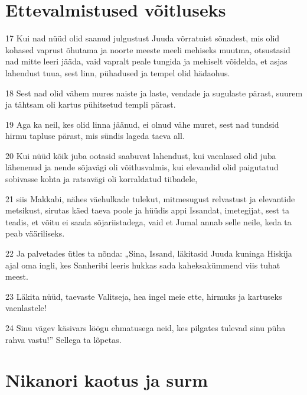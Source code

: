 \section*{Ettevalmistused võitluseks}

\par 17 Kui nad nüüd olid saanud julgustust Juuda võrratuist sõnadest, mis olid kohased vaprust õhutama ja noorte meeste meeli mehiseks muutma, otsustasid nad mitte leeri jääda, vaid vapralt peale tungida ja mehiselt võidelda, et asjas lahendust tuua, sest linn, pühadused ja tempel olid hädaohus.
\par 18 Sest nad olid vähem mures naiste ja laste, vendade ja sugulaste pärast, suurem ja tähtsam oli kartus pühitsetud templi pärast.
\par 19 Aga ka neil, kes olid linna jäänud, ei olnud vähe muret, sest nad tundsid hirmu tapluse pärast, mis sündis lageda taeva all.
\par 20 Kui nüüd kõik juba ootasid saabuvat lahendust, kui vaenlased olid juba lähenenud ja nende sõjavägi oli võitlusvalmis, kui elevandid olid paigutatud sobivasse kohta ja ratsavägi oli korraldatud tiibadele,
\par 21 siis Makkabi, nähes väehulkade tulekut, mitmesugust relvastust ja elevantide metsikust, sirutas käed taeva poole ja hüüdis appi Issandat, imetegijat, sest ta teadis, et võitu ei saada sõjariistadega, vaid et Jumal annab selle neile, keda ta peab vääriliseks.
\par 22 Ja palvetades ütles ta nõnda: „Sina, Issand, läkitasid Juuda kuninga Hiskija ajal oma ingli, kes Sanheribi leeris hukkas sada kaheksakümmend viis tuhat meest.
\par 23 Läkita nüüd, taevaste Valitseja, hea ingel meie ette, hirmuks ja kartuseks vaenlastele!
\par 24 Sinu vägev käsivars löögu ehmatusega neid, kes pilgates tulevad sinu püha rahva vastu!” Sellega ta lõpetas.


\section*{Nikanori kaotus ja surm}


